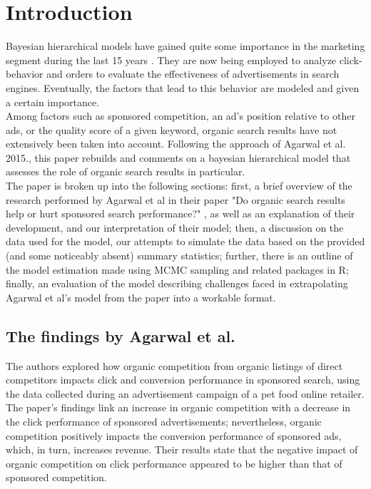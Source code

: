 \section{Introduction} \label{sec:intro}
Bayesian hierarchical models have gained quite some importance in the marketing segment during the last 15 years \citep{rossibook, ghose, agarwal_organic_2015}. They are now being employed to analyze click-behavior and orders to evaluate the effectiveness of advertisements in search engines. Eventually, the factors that lead to this behavior are modeled and given a certain importance.\\
Among factors such as sponsored competition, an ad's position relative to other ads, or the quality score of a given keyword, organic search results have not extensively been taken into account. Following the approach of Agarwal et al. 2015., this paper rebuilds and comments on a bayesian hierarchical model that assesses the role of organic search results in particular.\\
The paper is broken up into the following sections: first, a brief overview of the research performed by Agarwal et al in their paper "Do organic search results help or hurt sponsored search performance?" \citep{agarwal_organic_2015}, as well as an explanation of their development, and our interpretation of their model; then, a discussion on the data used for the model, our attempts to simulate the data based on the provided (and some noticeably absent) summary statistics; further, there is an outline of the model estimation made using MCMC sampling and related packages in R; finally, an evaluation of the model describing challenges faced in extrapolating Agarwal et al's model from the paper into a workable format.

\subsection{The findings by Agarwal et al.}
The authors explored how organic competition from organic listings of direct competitors impacts click and conversion performance in sponsored search, using the data collected during an advertisement campaign of a pet food online retailer. The paper's findings link an increase in organic competition with a decrease in the click performance of sponsored advertisements; nevertheless, organic competition positively impacts the conversion performance of sponsored ads, which, in turn, increases revenue. Their results state that the negative impact of organic competition on click performance appeared to be higher than that of sponsored competition.

